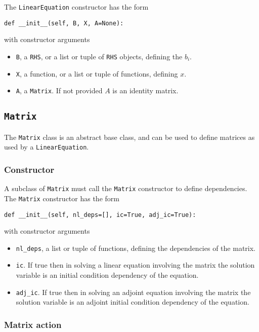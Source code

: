 \documentclass[11pt]{article}
\begin{document}
The \texttt{LinearEquation} constructor has the form
\begin{lstlisting}
def __init__(self, B, X, A=None):
\end{lstlisting}
with constructor arguments
\begin{itemize}
  \item \texttt{B}, a \texttt{RHS}, or a list or tuple of \texttt{RHS} objects,
    defining the $b_i$.
  \item \texttt{X}, a function, or a list or tuple of functions, defining $x$.
  \item \texttt{A}, a \texttt{Matrix}. If not provided $A$ is an identity
    matrix.
\end{itemize}

\subsection{\texttt{Matrix}}

The \texttt{Matrix} class is an abstract base class, and can be used to define
matrices as used by a \texttt{LinearEquation}.

\subsubsection{Constructor}

A subclass of \texttt{Matrix} must call the \texttt{Matrix} constructor to
define dependencies. The \texttt{Matrix} constructor has the form
\begin{lstlisting}
def __init__(self, nl_deps=[], ic=True, adj_ic=True):
\end{lstlisting}
with constructor arguments
\begin{itemize}
  \item \texttt{nl\_deps}, a list or tuple of functions, defining the
    dependencies of the matrix.
  \item \texttt{ic}. If true then in solving a linear equation involving the
    matrix the solution variable is an initial condition dependency of the
    equation.
  \item \texttt{adj\_ic}. If true then in solving an adjoint equation
    involving the matrix the solution variable is an adjoint initial
    condition dependency of the equation.
\end{itemize}

\subsubsection{Matrix action}
\end{document}
